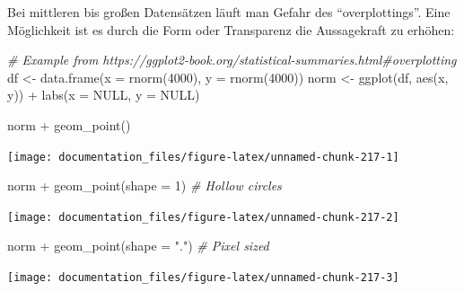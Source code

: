 \documentclass[
]{article}
\newenvironment{Shaded}{\begin{snugshade}}{\end{snugshade}}
\newcommand{\AttributeTok}[1]{\textcolor[rgb]{0.77,0.63,0.00}{#1}}
\newcommand{\CommentTok}[1]{\textcolor[rgb]{0.56,0.35,0.01}{\textit{#1}}}
\newcommand{\ConstantTok}[1]{\textcolor[rgb]{0.00,0.00,0.00}{#1}}
\newcommand{\DecValTok}[1]{\textcolor[rgb]{0.00,0.00,0.81}{#1}}
\newcommand{\FunctionTok}[1]{\textcolor[rgb]{0.00,0.00,0.00}{#1}}
\newcommand{\NormalTok}[1]{#1}
\newcommand{\OtherTok}[1]{\textcolor[rgb]{0.56,0.35,0.01}{#1}}
\newcommand{\SpecialCharTok}[1]{\textcolor[rgb]{0.00,0.00,0.00}{#1}}
\newcommand{\StringTok}[1]{\textcolor[rgb]{0.31,0.60,0.02}{#1}}
\begin{document}
Bei mittleren bis großen Datensätzen läuft man Gefahr des ``overplottings''. Eine Möglichkeit ist es durch die Form oder Transparenz die Aussagekraft zu erhöhen:

\begin{Shaded}
\begin{Highlighting}[]
\CommentTok{\# Example from https://ggplot2{-}book.org/statistical{-}summaries.html\#overplotting}
\NormalTok{df }\OtherTok{\textless{}{-}} \FunctionTok{data.frame}\NormalTok{(}\AttributeTok{x =} \FunctionTok{rnorm}\NormalTok{(}\DecValTok{4000}\NormalTok{), }\AttributeTok{y =} \FunctionTok{rnorm}\NormalTok{(}\DecValTok{4000}\NormalTok{))}
\NormalTok{norm }\OtherTok{\textless{}{-}} \FunctionTok{ggplot}\NormalTok{(df, }\FunctionTok{aes}\NormalTok{(x, y)) }\SpecialCharTok{+} 
  \FunctionTok{labs}\NormalTok{(}\AttributeTok{x =} \ConstantTok{NULL}\NormalTok{, }\AttributeTok{y =} \ConstantTok{NULL}\NormalTok{) }

\NormalTok{norm }\SpecialCharTok{+} \FunctionTok{geom\_point}\NormalTok{()}
\end{Highlighting}
\end{Shaded}

\begin{center}\texttt{[image: documentation\_files/figure-latex/unnamed-chunk-217-1]} \end{center}

\begin{Shaded}
\begin{Highlighting}[]
\NormalTok{norm }\SpecialCharTok{+} \FunctionTok{geom\_point}\NormalTok{(}\AttributeTok{shape =} \DecValTok{1}\NormalTok{) }\CommentTok{\# Hollow circles}
\end{Highlighting}
\end{Shaded}

\begin{center}\texttt{[image: documentation\_files/figure-latex/unnamed-chunk-217-2]} \end{center}

\begin{Shaded}
\begin{Highlighting}[]
\NormalTok{norm }\SpecialCharTok{+} \FunctionTok{geom\_point}\NormalTok{(}\AttributeTok{shape =} \StringTok{"."}\NormalTok{) }\CommentTok{\# Pixel sized}
\end{Highlighting}
\end{Shaded}

\begin{center}\texttt{[image: documentation\_files/figure-latex/unnamed-chunk-217-3]} \end{center}
\end{document}
